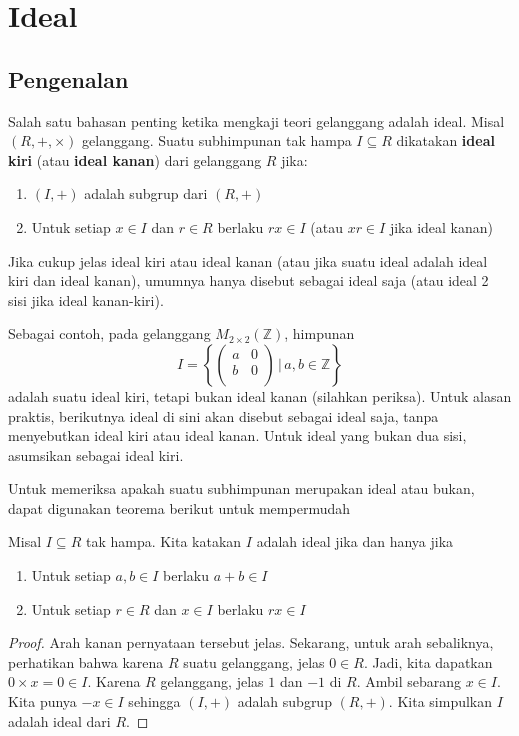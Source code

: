 	\section{Ideal}
	\subsection{Pengenalan}
	Salah satu bahasan penting ketika mengkaji teori gelanggang adalah ideal. Misal $(R,+,\times)$ gelanggang. Suatu subhimpunan tak hampa $I \subseteq R$ dikatakan \textbf{ideal kiri} (atau \textbf{ideal kanan}) dari gelanggang $R$ jika:
	\begin{enumerate}
		\item $(I,+)$ adalah subgrup dari $(R,+)$
		\item Untuk setiap $x \in I$ dan $r \in R$ berlaku $rx \in I$ (atau $xr \in I$ jika ideal kanan)
	\end{enumerate}
	Jika cukup jelas ideal kiri atau ideal kanan (atau jika suatu ideal adalah ideal kiri dan ideal kanan), umumnya hanya disebut sebagai ideal saja (atau ideal 2 sisi jika ideal kanan-kiri). 
	
	Sebagai contoh, pada gelanggang $M_{2\times 2}(\mathbb{Z})$, himpunan $$I = \left\{ \left( \begin{matrix}
	a & 0\\
	b & 0\\
	\end{matrix}\right) \, | \, a,b \in \mathbb{Z} \right\}$$ adalah suatu ideal kiri, tetapi bukan ideal kanan (silahkan periksa). Untuk alasan praktis, berikutnya ideal di sini akan disebut sebagai ideal saja, tanpa menyebutkan ideal kiri atau ideal kanan. Untuk ideal yang bukan dua sisi, asumsikan sebagai ideal kiri.
	
	Untuk memeriksa apakah suatu subhimpunan merupakan ideal atau bukan, dapat digunakan teorema berikut untuk mempermudah
	
	\begin{theorem}
		Misal $I \subseteq R$ tak hampa. Kita katakan $I$ adalah ideal jika dan hanya jika
		\begin{enumerate}
			\item Untuk setiap $a,b \in I$ berlaku $a+b \in I$
			\item Untuk setiap $r \in R$ dan $x \in I$ berlaku $rx \in I$
		\end{enumerate}
	\end{theorem}
	\begin{proof}
		Arah kanan pernyataan tersebut jelas. Sekarang, untuk arah sebaliknya, perhatikan bahwa karena $R$ suatu gelanggang, jelas $0 \in R$. Jadi, kita dapatkan $0 \times x = 0 \in I$. Karena $R$ gelanggang, jelas $1$ dan $-1$ di $R$. Ambil sebarang $x \in I$. Kita punya $-x \in I$ sehingga $(I,+)$ adalah subgrup $(R,+)$. Kita simpulkan $I$ adalah ideal dari $R$.
	\end{proof}

